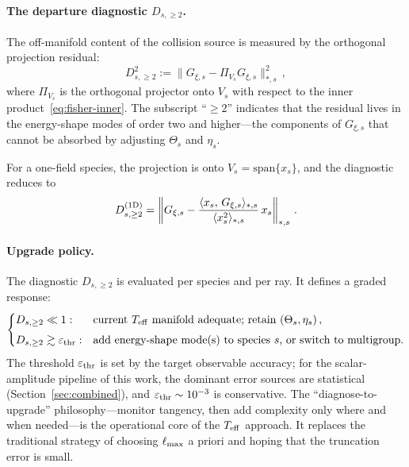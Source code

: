 \paragraph{The departure diagnostic $D_{s,\geq 2}$.}

The off-manifold content of the collision source is
measured by the orthogonal projection residual:
\begin{equation}\label{eq:D-diagnostic}
D_{s,\geq 2}^2
:= \big\|
  G_{\xi,s} - \Pi_{V_s} G_{\xi,s}
\big\|_{*,s}^2\,,
\end{equation}
where $\Pi_{V_s}$ is the orthogonal projector onto
$V_s$ with respect to the inner
product~\eqref{eq:fisher-inner}.  The subscript
``$\geq 2$'' indicates that the residual lives in the
energy-shape modes of order two and higher---the
components of $G_{\xi,s}$ that cannot be absorbed by
adjusting $\Theta_s$ and $\eta_s$.

For a one-field species, the projection is onto
$V_s = \mathrm{span}\{x_s\}$, and the diagnostic
reduces to
\begin{equation}\label{eq:D-one-field}
D_{s,\geq 2}^{\rm (1D)}
= \left\|
  G_{\xi,s}
  - \frac{\langle x_s,\, G_{\xi,s}\rangle_{*,s}}
         {\langle x_s^2 \rangle_{*,s}}\, x_s
\right\|_{*,s}\,.
\end{equation}


\paragraph{Upgrade policy.}

The diagnostic $D_{s,\geq 2}$ is evaluated per
species and per ray.  It defines a graded response:
\begin{equation}\label{eq:upgrade-policy}
\begin{cases}
D_{s,\geq 2} \ll 1:
  & \text{current $T_{\mathrm{eff}}$ manifold adequate;
    retain $(\Theta_s, \eta_s)$}\,, \\[4pt]
D_{s,\geq 2} \gtrsim \varepsilon_{\rm thr}:
  & \text{add energy-shape mode(s) to species $s$,
    or switch to multigroup.}
\end{cases}
\end{equation}
The threshold $\varepsilon_{\rm thr}$ is set by the
target observable accuracy; for the scalar-amplitude
pipeline of this work, the dominant error sources are
statistical (Section~\ref{sec:combined}), and
$\varepsilon_{\rm thr} \sim 10^{-3}$ is conservative.
The ``diagnose-to-upgrade'' philosophy---monitor
tangency, then add complexity only where and when
needed---is the operational core of the $T_{\mathrm{eff}}$
approach.  It replaces the traditional strategy of
choosing $\ell_{\rm max}$ a priori and hoping that the
truncation error is small.


